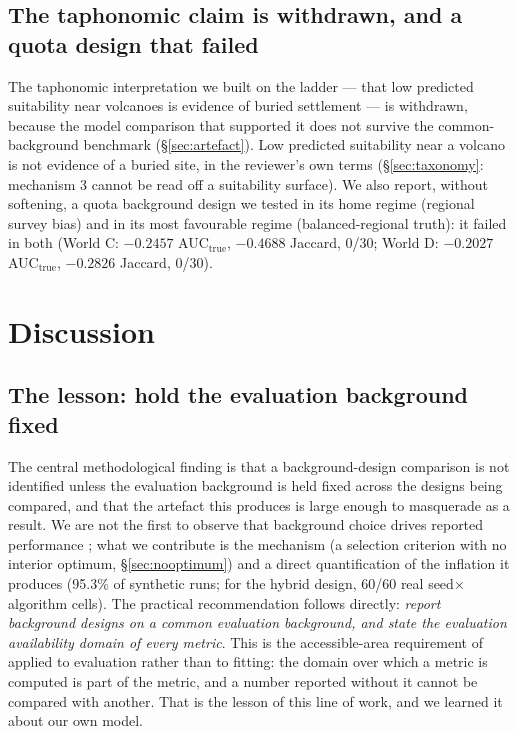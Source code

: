 \documentclass[12pt]{article}
\begin{document}
\subsection{The taphonomic claim is withdrawn, and a quota design that failed}
\label{sec:withdrawal}

The taphonomic interpretation we built on the ladder --- that low predicted suitability near volcanoes is evidence of buried settlement --- is withdrawn, because the model comparison that supported it does not survive the common-background benchmark (\S\ref{sec:artefact}).
Low predicted suitability near a volcano is not evidence of a buried site, in the reviewer's own terms (\S\ref{sec:taxonomy}: mechanism 3 cannot be read off a suitability surface).
We also report, without softening, a quota background design we tested in its home regime (regional survey bias) and in its most favourable regime (balanced-regional truth): it failed in both (World C: $-0.2457$ AUC$_{\text{true}}$, $-0.4688$ Jaccard, 0/30; World D: $-0.2027$ AUC$_{\text{true}}$, $-0.2826$ Jaccard, 0/30).

\section{Discussion}

\subsection{The lesson: hold the evaluation background fixed}

The central methodological finding is that a background-design comparison is not identified unless the evaluation background is held fixed across the designs being compared, and that the artefact this produces is large enough to masquerade as a result.
We are not the first to observe that background choice drives reported performance \citep{phillips2009, lobo2008, hijmans2012}; what we contribute is the mechanism (a selection criterion with no interior optimum, \S\ref{sec:nooptimum}) and a direct quantification of the inflation it produces (95.3\% of synthetic runs; for the hybrid design, 60/60 real seed$\times$algorithm cells).
The practical recommendation follows directly: \emph{report background designs on a common evaluation background, and state the evaluation availability domain of every metric}.
This is the accessible-area requirement of \citet{barve2011} applied to evaluation rather than to fitting: the domain over which a metric is computed is part of the metric, and a number reported without it cannot be compared with another.
That is the lesson of this line of work, and we learned it about our own model.
\end{document}
